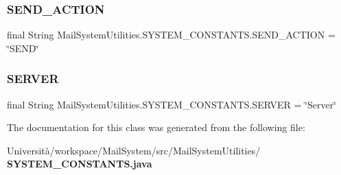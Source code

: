 \subsubsection{S\+E\+N\+D\+\_\+\+A\+C\+T\+I\+ON}
{\footnotesize\ttfamily final String Mail\+System\+Utilities.\+S\+Y\+S\+T\+E\+M\+\_\+\+C\+O\+N\+S\+T\+A\+N\+T\+S.\+S\+E\+N\+D\+\_\+\+A\+C\+T\+I\+ON = \char`\"{}S\+E\+ND\char`\"{}\hspace{0.3cm}{\ttfamily [static]}}

\mbox{\label{class_mail_system_utilities_1_1_s_y_s_t_e_m___c_o_n_s_t_a_n_t_s_a0e7119ce39444b043aa7f5395a3819ef}} 
\subsubsection{S\+E\+R\+V\+ER}
{\footnotesize\ttfamily final String Mail\+System\+Utilities.\+S\+Y\+S\+T\+E\+M\+\_\+\+C\+O\+N\+S\+T\+A\+N\+T\+S.\+S\+E\+R\+V\+ER = \char`\"{}Server\char`\"{}\hspace{0.3cm}{\ttfamily [static]}}



The documentation for this class was generated from the following file\+:\begin{DoxyCompactItemize}
\item 
Università/workspace/\+Mail\+System/src/\+Mail\+System\+Utilities/\textbf{ S\+Y\+S\+T\+E\+M\+\_\+\+C\+O\+N\+S\+T\+A\+N\+T\+S.\+java}\end{DoxyCompactItemize}
